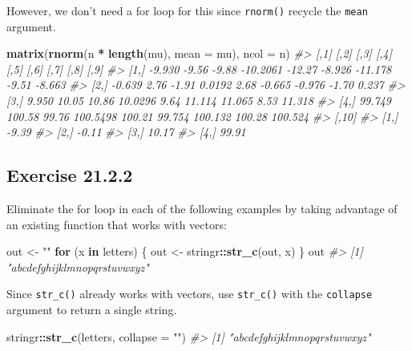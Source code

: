 \documentclass[]{book}
\newenvironment{Shaded}{\begin{snugshade}}{\end{snugshade}}
\newcommand{\CommentTok}[1]{\textcolor[rgb]{0.56,0.35,0.01}{\textit{#1}}}
\newcommand{\ControlFlowTok}[1]{\textcolor[rgb]{0.13,0.29,0.53}{\textbf{#1}}}
\newcommand{\DataTypeTok}[1]{\textcolor[rgb]{0.13,0.29,0.53}{#1}}
\newcommand{\KeywordTok}[1]{\textcolor[rgb]{0.13,0.29,0.53}{\textbf{#1}}}
\newcommand{\NormalTok}[1]{#1}
\newcommand{\OperatorTok}[1]{\textcolor[rgb]{0.81,0.36,0.00}{\textbf{#1}}}
\newcommand{\StringTok}[1]{\textcolor[rgb]{0.31,0.60,0.02}{#1}}
\theoremstyle{plain}
\theoremstyle{remark}
\begin{document}
However, we don't need a for loop for this since \texttt{rnorm()}
recycle the \texttt{mean} argument.

\begin{Shaded}
\begin{Highlighting}[]
\KeywordTok{matrix}\NormalTok{(}\KeywordTok{rnorm}\NormalTok{(n }\OperatorTok{*}\StringTok{ }\KeywordTok{length}\NormalTok{(mu), }\DataTypeTok{mean =}\NormalTok{ mu), }\DataTypeTok{ncol =}\NormalTok{ n)}
\CommentTok{#>        [,1]   [,2]  [,3]     [,4]   [,5]   [,6]    [,7]   [,8]    [,9]}
\CommentTok{#> [1,] -9.930  -9.56 -9.88 -10.2061 -12.27 -8.926 -11.178  -9.51  -8.663}
\CommentTok{#> [2,] -0.639   2.76 -1.91   0.0192   2.68 -0.665  -0.976  -1.70   0.237}
\CommentTok{#> [3,]  9.950  10.05 10.86  10.0296   9.64 11.114  11.065   8.53  11.318}
\CommentTok{#> [4,] 99.749 100.58 99.76 100.5498 100.21 99.754 100.132 100.28 100.524}
\CommentTok{#>      [,10]}
\CommentTok{#> [1,] -9.39}
\CommentTok{#> [2,] -0.11}
\CommentTok{#> [3,] 10.17}
\CommentTok{#> [4,] 99.91}
\end{Highlighting}
\end{Shaded}

\hypertarget{exercise-21.2.2}{%
\subsection*{\texorpdfstring{Exercise
{21.2.2}}{Exercise 21.2.2}}\label{exercise-21.2.2}}

Eliminate the for loop in each of the following examples by taking
advantage of an existing function that works with vectors:

\begin{Shaded}
\begin{Highlighting}[]
\NormalTok{out <-}\StringTok{ ""}
\ControlFlowTok{for}\NormalTok{ (x }\ControlFlowTok{in}\NormalTok{ letters) \{}
\NormalTok{  out <-}\StringTok{ }\NormalTok{stringr}\OperatorTok{::}\KeywordTok{str_c}\NormalTok{(out, x)}
\NormalTok{\}}
\NormalTok{out}
\CommentTok{#> [1] "abcdefghijklmnopqrstuvwxyz"}
\end{Highlighting}
\end{Shaded}

Since \texttt{str\_c()} already works with vectors, use
\texttt{str\_c()} with the \texttt{collapse} argument to return a single
string.

\begin{Shaded}
\begin{Highlighting}[]
\NormalTok{stringr}\OperatorTok{::}\KeywordTok{str_c}\NormalTok{(letters, }\DataTypeTok{collapse =} \StringTok{""}\NormalTok{)}
\CommentTok{#> [1] "abcdefghijklmnopqrstuvwxyz"}
\end{Highlighting}
\end{Shaded}
\end{document}
